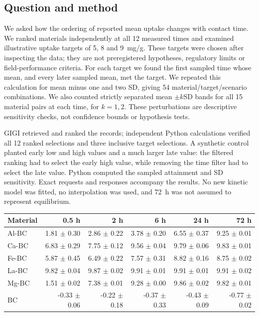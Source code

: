 \documentclass[11pt,letterpaper]{article}
\begin{document}
\subsection{Question and method}
We asked how the ordering of reported mean uptake changes with contact time. We ranked materials independently at all 12 measured times and examined illustrative uptake targets of 5, 8 and 9~mg/g. These targets were chosen after inspecting the data; they are not preregistered hypotheses, regulatory limits or field-performance criteria. For each target we found the first sampled time whose mean, and every later sampled mean, met the target. We repeated this calculation for mean minus one and two SD, giving 54 material/target/scenario combinations. We also counted strictly separated mean $\pm k$SD bands for all 15 material pairs at each time, for $k=1,2$. These perturbations are descriptive sensitivity checks, not confidence bounds or hypothesis tests.

GIGI retrieved and ranked the records; independent Python calculations verified all 12 ranked selections and three inclusive target selections. A synthetic control planted early low and high values and a much larger late value: the filtered ranking had to select the early high value, while removing the time filter had to select the late value. Python computed the sampled attainment and SD sensitivity. Exact requests and responses accompany the results. No new kinetic model was fitted, no interpolation was used, and 72~h was not assumed to represent equilibrium.

\begin{center}\begin{minipage}{\textwidth}\centering\small
{}
\begin{tabular}{@{}lrrrrr@{}}\toprule
Material & 0.5 h & 2 h & 6 h & 24 h & 72 h\\\midrule
Al-BC & 1.81 $\pm$ 0.30 & 2.86 $\pm$ 0.22 & 3.78 $\pm$ 0.20 & 6.55 $\pm$ 0.37 & 9.25 $\pm$ 0.01 \\
Ca-BC & 6.83 $\pm$ 0.29 & 7.75 $\pm$ 0.12 & 9.56 $\pm$ 0.04 & 9.79 $\pm$ 0.06 & 9.83 $\pm$ 0.01 \\
Fe-BC & 5.87 $\pm$ 0.45 & 6.49 $\pm$ 0.22 & 7.57 $\pm$ 0.31 & 8.82 $\pm$ 0.16 & 8.75 $\pm$ 0.02 \\
La-BC & 9.82 $\pm$ 0.04 & 9.87 $\pm$ 0.02 & 9.91 $\pm$ 0.01 & 9.91 $\pm$ 0.01 & 9.91 $\pm$ 0.02 \\
Mg-BC & 1.51 $\pm$ 0.02 & 7.38 $\pm$ 0.01 & 9.28 $\pm$ 0.00 & 9.86 $\pm$ 0.02 & 9.82 $\pm$ 0.01 \\
BC & -0.33 $\pm$ 0.06 & -0.22 $\pm$ 0.18 & -0.37 $\pm$ 0.33 & -0.43 $\pm$ 0.09 & -0.77 $\pm$ 0.02 \\
\bottomrule\end{tabular}
\end{minipage}\end{center}
\end{document}
